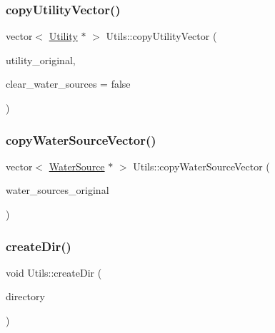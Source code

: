 \subsubsection{\texorpdfstring{copy\+Utility\+Vector()}{copyUtilityVector()}}
{\footnotesize\ttfamily vector$<$ \mbox{\hyperlink{classUtility}{Utility}} $\ast$ $>$ Utils\+::copy\+Utility\+Vector (\begin{DoxyParamCaption}\item[{vector$<$ \mbox{\hyperlink{classUtility}{Utility}} $\ast$$>$}]{utility\+\_\+original,  }\item[{bool}]{clear\+\_\+water\+\_\+sources = {\ttfamily false} }\end{DoxyParamCaption})\hspace{0.3cm}{\ttfamily [static]}}

\mbox{\label{classUtils_ad83b39de47909892725f2d9a8ee0ff1a_ad83b39de47909892725f2d9a8ee0ff1a}} 
\subsubsection{\texorpdfstring{copy\+Water\+Source\+Vector()}{copyWaterSourceVector()}}
{\footnotesize\ttfamily vector$<$ \mbox{\hyperlink{classWaterSource}{Water\+Source}} $\ast$ $>$ Utils\+::copy\+Water\+Source\+Vector (\begin{DoxyParamCaption}\item[{vector$<$ \mbox{\hyperlink{classWaterSource}{Water\+Source}} $\ast$$>$}]{water\+\_\+sources\+\_\+original }\end{DoxyParamCaption})\hspace{0.3cm}{\ttfamily [static]}}

\mbox{\label{classUtils_ad22978d5ae586f881920c2c2452436ce_ad22978d5ae586f881920c2c2452436ce}} 
\subsubsection{\texorpdfstring{create\+Dir()}{createDir()}}
{\footnotesize\ttfamily void Utils\+::create\+Dir (\begin{DoxyParamCaption}\item[{string}]{directory }\end{DoxyParamCaption})\hspace{0.3cm}{\ttfamily [static]}}

